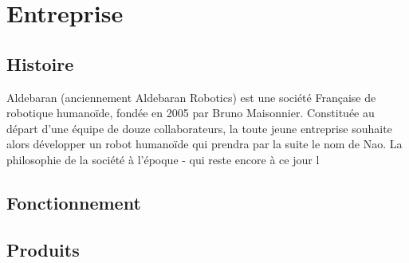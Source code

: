\chapter*{Entreprise}
\label{Entreprise}
\thispagestyle{fancy}

\section{Histoire}
\label{Entreprise: histoire}
Aldebaran (anciennement Aldebaran Robotics) est une société Française de robotique humanoïde, fondée en 2005 par Bruno Maisonnier. 
Constituée au départ d'une équipe de douze collaborateurs, la toute jeune entreprise souhaite alors développer un robot humanoïde qui prendra par la suite le nom de Nao. La philosophie de la société à l'époque - qui reste encore à ce jour l

\section{Fonctionnement}

\section{Produits}